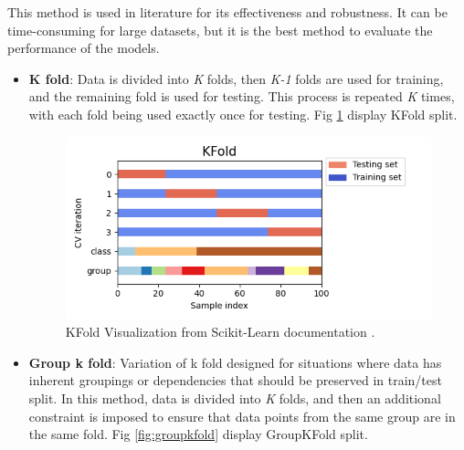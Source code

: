                 This method is used in literature for its effectiveness and robustness. It can be time-consuming for large datasets, but it is the best method to evaluate the performance of the models.

                \begin{itemize}

                    \item \textbf{K fold}: Data is divided into \textit{K} folds, then \textit{K-1} folds are used for training, and the remaining fold is used for testing. This process is repeated \textit{K} times, with each fold being used exactly once for testing. Fig \ref{fig:kfold} display KFold split.
                    
                    \begin{figure}[H]
                        \centering
                        \includegraphics[width=1.0\textwidth]{../src/resources/images/other/kfold.png}
                        \caption{
                          KFold Visualization from Scikit-Learn documentation \cite{scikit-learn}.
                        }
                        \label{fig:kfold}
                    \end{figure}

                    \item \textbf{Group k fold}: Variation of k fold designed for situations where data has inherent groupings or dependencies that should be preserved in train/test split. In this method, data is divided into \textit{K} folds, and then an additional constraint is imposed to ensure that data points from the same group are in the same fold. Fig \ref{fig:groupkfold} display GroupKFold split.
                    

\end{itemize}
